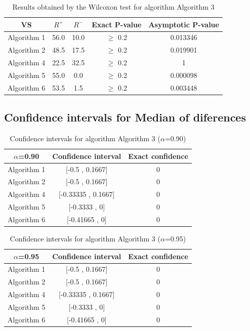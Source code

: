 \documentclass[a4paper,10pt]{article}
\begin{document}
\begin{table}[!htp]
\centering\small
\begin{tabular}{
|c|c|c|c|c|}
\hline
 VS & $R^{+}$ & $R^{-}$ & Exact P-value & Asymptotic P-value \\ \hline 
Algorithm 1 & 56.0 & 10.0 & $\geq$ 0.2 & 0.013346\\ \hline 
Algorithm 2 & 48.5 & 17.5 & $\geq$ 0.2 & 0.019901\\ \hline 
Algorithm 4 & 22.5 & 32.5 & $\geq$ 0.2 & 1\\ \hline 
Algorithm 5 & 55.0 & 0.0 & $\geq$ 0.2 & 0.000098\\ \hline 
Algorithm 6 & 53.5 & 1.5 & $\geq$ 0.2 & 0.003448\\ \hline 

\end{tabular}
\caption{Results obtained by the Wilcoxon test for algorithm Algorithm 3}
\end{table}

\subsection{Confidence intervals for Median of diferences}

\begin{table}[!htp]
\centering\small
\begin{tabular}{
|c|c|c|}
\hline
 $\alpha$=0.90 & Confidence interval & Exact confidence \\ \hline 
Algorithm 1 & [-0.5 , 0.1667] & 0\\ \hline 
Algorithm 2 & [-0.5 , 0.1667] & 0\\ \hline 
Algorithm 4 & [-0.33335 , 0.1667] & 0\\ \hline 
Algorithm 5 & [-0.3333 , 0] & 0\\ \hline 
Algorithm 6 & [-0.41665 , 0] & 0\\ \hline 

\end{tabular}
\caption{Confidence intervals for algorithm Algorithm 3 ($\alpha$=0.90)}
\end{table}
\begin{table}[!htp]
\centering\small
\begin{tabular}{
|c|c|c|}
\hline
 $\alpha$=0.95 & Confidence interval & Exact confidence \\ \hline 
Algorithm 1 & [-0.5 , 0.1667] & 0\\ \hline 
Algorithm 2 & [-0.5 , 0.1667] & 0\\ \hline 
Algorithm 4 & [-0.33335 , 0.1667] & 0\\ \hline 
Algorithm 5 & [-0.3333 , 0] & 0\\ \hline 
Algorithm 6 & [-0.41665 , 0] & 0\\ \hline 

\end{tabular}
\caption{Confidence intervals for algorithm Algorithm 3 ($\alpha$=0.95)}
\end{table}
\end{document}
